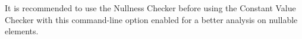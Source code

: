 It is recommended to use the Nullness Checker before using the Constant Value Checker
with this command-line option enabled for a better analysis on nullable elements.

